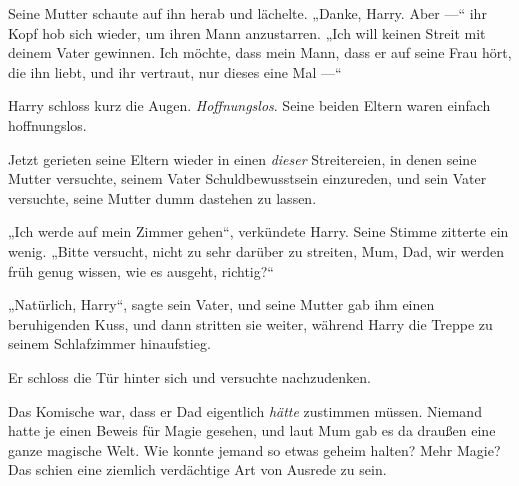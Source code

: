 Seine Mutter schaute auf ihn herab und lächelte. „Danke, Harry. Aber —“ ihr Kopf hob sich wieder, um ihren Mann anzustarren. „Ich will keinen Streit mit deinem Vater gewinnen. Ich möchte, dass mein Mann, dass er auf seine Frau hört, die ihn liebt, und ihr vertraut, nur dieses eine Mal —“

Harry schloss kurz die Augen. \emph{Hoffnungslos}. Seine beiden Eltern waren einfach hoffnungslos.

Jetzt gerieten seine Eltern wieder in einen \emph{dieser} Streitereien, in denen seine Mutter versuchte, seinem Vater Schuldbewusstsein einzureden, und sein Vater versuchte, seine Mutter dumm dastehen zu lassen.

„Ich werde auf mein Zimmer gehen“, verkündete Harry. Seine Stimme zitterte ein wenig. „Bitte versucht, nicht zu sehr darüber zu streiten, Mum, Dad, wir werden früh genug wissen, wie es ausgeht, richtig?“

„Natürlich, Harry“, sagte sein Vater, und seine Mutter gab ihm einen beruhigenden Kuss, und dann stritten sie weiter, während Harry die Treppe zu seinem Schlafzimmer hinaufstieg.

Er schloss die Tür hinter sich und versuchte nachzudenken.

Das Komische war, dass er Dad eigentlich \emph{hätte} zustimmen müssen. Niemand hatte je einen Beweis für Magie gesehen, und laut Mum gab es da draußen eine ganze magische Welt. Wie konnte jemand so etwas geheim halten? Mehr Magie? Das schien eine ziemlich verdächtige Art von Ausrede zu sein.

